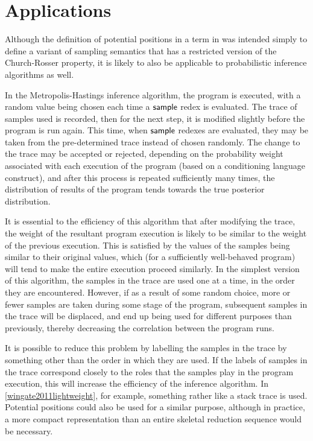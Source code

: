 \section{Applications}
\label{sec:applications}
Although the definition of potential positions in a term in  was intended simply to define a variant of sampling semantics that has a restricted version of the Church-Rosser property, it is likely to also be applicable to probabilistic inference algorithms as well.

In the Metropolis-Hastings inference algorithm, the program is executed, with a random value being chosen each time a $\mathsf{sample}$ redex is evaluated. The trace of samples used is recorded, then for the next step, it is modified slightly before the program is run again. This time, when $\mathsf{sample}$ redexes are evaluated, they may be taken from the pre-determined trace instead of chosen randomly. The change to the trace may be accepted or rejected, depending on the probability weight associated with each execution of the program (based on a conditioning language construct), and after this process is repeated sufficiently many times, the distribution of results of the program tends towards the true posterior distribution.

It is essential to the efficiency of this algorithm that after modifying the trace, the weight of the resultant program execution is likely to be similar to the weight of the previous execution. This is satisfied by the values of the samples being similar to their original values, which (for a sufficiently well-behaved program) will tend to make the entire execution proceed similarly. In the simplest version of this algorithm, the samples in the trace are used one at a time, in the order they are encountered. However, if as a result of some random choice, more or fewer samples are taken during some stage of the program, subsequent samples in the trace will be displaced, and end up being used for different purposes than previously, thereby decreasing the correlation between the program runs.

It is possible to reduce this problem by labelling the samples in the trace by something other than the order in which they are used. If the labels of samples in the trace correspond closely to the roles that the samples play in the program execution, this will increase the efficiency of the inference algorithm. In \ref{wingate2011lightweight}, for example, something rather like a stack trace is used. Potential positions could also be used for a similar purpose, although in practice, a more compact representation than an entire skeletal reduction sequence would be necessary.
